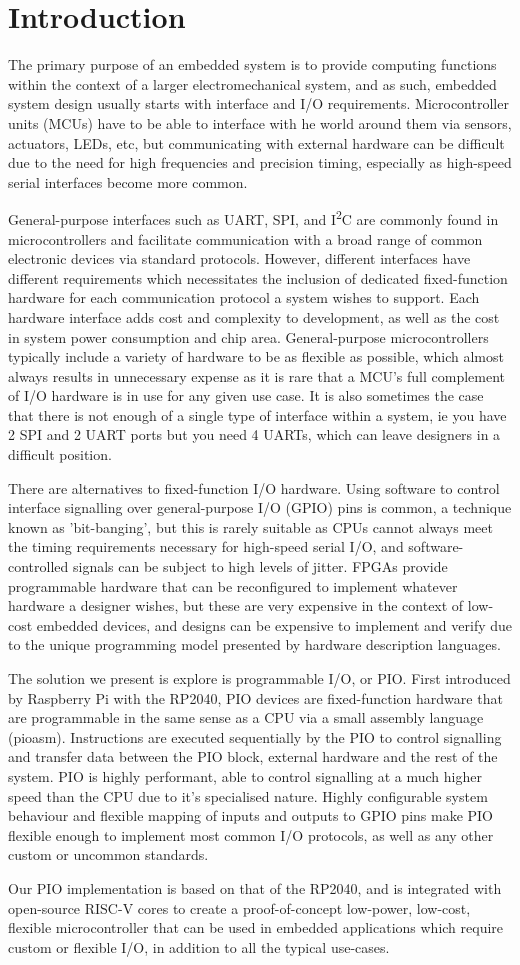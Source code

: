 \chapter{Introduction}
\label{ch:introduction}

The primary purpose of an embedded system is to provide computing functions within the context of a larger electromechanical system, and as such, embedded system design usually starts with interface and I/O requirements. Microcontroller units (MCUs) have to be able to interface with he world around them via sensors, actuators, LEDs, etc, but communicating with external hardware can be difficult due to the need for high frequencies and precision timing, especially as high-speed serial interfaces become more common.

General-purpose interfaces such as UART, SPI, and I\textsuperscript{2}C are commonly found in microcontrollers and facilitate communication with a broad range of common electronic devices via standard protocols. However, different interfaces have different requirements which necessitates the inclusion of dedicated fixed-function hardware for each communication protocol a system wishes to support. Each hardware interface adds cost and complexity to development, as well as the cost in system power consumption and chip area. General-purpose microcontrollers typically include a variety of hardware to be as flexible as possible, which almost always results in unnecessary expense as it is rare that a MCU's full complement of I/O hardware is in use for any given use case. It is also sometimes the case that there is not enough of a single type of interface within a system, ie you have 2 SPI and 2 UART ports but you need 4 UARTs, which can leave designers in a difficult position.

There are alternatives to fixed-function I/O hardware. Using software to control interface signalling over general-purpose I/O (GPIO) pins is common, a technique known as 'bit-banging', but this is rarely suitable as CPUs cannot always meet the timing requirements necessary for high-speed serial I/O, and software-controlled signals can be subject to high levels of jitter. FPGAs provide programmable hardware that can be reconfigured to implement whatever hardware a designer wishes, but these are very expensive in the context of low-cost embedded devices, and designs can be expensive to implement and verify due to the unique programming model presented by hardware description languages.

The solution we present is explore is programmable I/O, or PIO. First introduced by Raspberry Pi with the RP2040, PIO devices are fixed-function hardware that are programmable in the same sense as a CPU via a small assembly language (pioasm). Instructions are executed sequentially by the PIO to control signalling and transfer data between the PIO block, external hardware and the rest of the system. PIO is highly performant, able to control signalling at a much higher speed than the CPU due to it's specialised nature. Highly configurable system behaviour and flexible mapping of inputs and outputs to GPIO pins make PIO flexible enough to implement most common I/O protocols, as well as any other custom or uncommon standards.

Our PIO implementation is based on that of the RP2040, and is integrated with open-source RISC-V cores to create a proof-of-concept low-power, low-cost, flexible microcontroller that can be used in embedded applications which require custom or flexible I/O, in addition to all the typical use-cases.